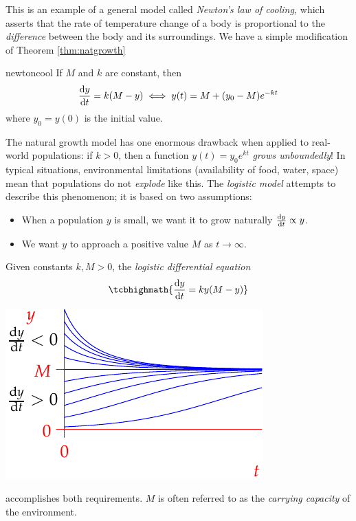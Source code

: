 \goodbreak

This is an example of a general model called \emph{Newton's law of cooling,} which asserts that the rate of temperature change of a body is proportional to the \emph{difference} between the body and its surroundings. We have a simple modification of Theorem \ref{thm:natgrowth}

\begin{cor}{}{newtoncool}
If $M$ and $k$ are constant, then
\[\diff[y]{t}=k(M-y)\iff y(t)=M+(y_0-M)e^{-kt}\]
where $y_0=y(0)$ is the initial value.
\end{cor}




The natural growth model has one enormous drawback when applied to real-world populations: if $k>0$, then a function $y(t)=y_0e^{kt}$ \emph{grows unboundedly}! In typical situations, environmental limitations (availability of food, water, space) mean that populations do not \emph{explode} like this. The \emph{logistic model} attempts to describe this phenomenon; it is based on two assumptions:\par
\begin{minipage}[t]{0.6\linewidth}\vspace{-5pt}
\begin{itemize}
  \item When a population $y$ is small, we want it to grow naturally $\diff[y]{t}\propto y$.
	\item We want $y$ to approach a positive value $M$ as $t\to \infty$.
\end{itemize}
Given constants $k,M>0$, the \emph{logistic differential equation}
\[\tcbhighmath{\diff[y]{t}=ky(M-y)}\]
\end{minipage}\hfill
\begin{minipage}[t]{0.39\linewidth}\vspace{0pt}
\flushright\includegraphics{logisticsf}
\end{minipage}\medbreak
accomplishes both requirements. $M$ is often referred to as the \emph{carrying capacity} of the environment.



